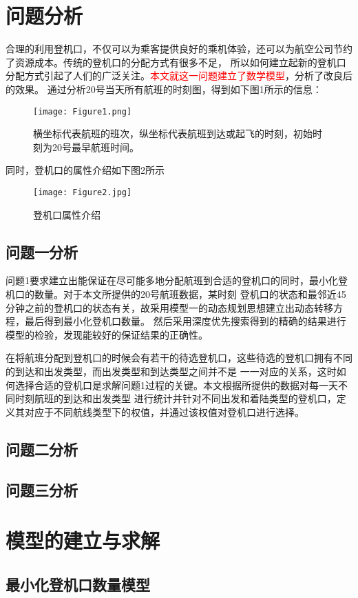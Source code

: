 \documentclass[bwprint]{gmcmthesis}
\begin{document}
\section{问题分析}
合理的利用登机口，不仅可以为乘客提供良好的乘机体验，还可以为航空公司节约了资源成本。传统的登机口的分配方式有很多不足，
所以如何建立起新的登机口分配方式引起了人们的广泛关注。\textcolor{red}{本文就这一问题建立了数学模型}，分析了改良后的效果。
通过分析20号当天所有航班的时刻图，得到如下图1所示的信息：
\begin{figure}[!h]
\centering
\texttt{[image: Figure1.png]}
\caption{
横坐标代表航班的班次，纵坐标代表航班到达或起飞的时刻，初始时刻为20号最早航班时间。}
\end{figure}

同时，登机口的属性介绍如下图2所示
\begin{figure}[!h]
\centering
\texttt{[image: Figure2.jpg]}
\caption{登机口属性介绍}
\end{figure}
\subsection{问题一分析}
问题1要求建立出能保证在尽可能多地分配航班到合适的登机口的同时，最小化登机口的数量。对于本文所提供的20号航班数据，某时刻
登机口的状态和最邻近45分钟之前的登机口的状态有关，故采用模型一的动态规划思想建立出动态转移方程，最后得到最小化登机口数量。
然后采用深度优先搜索得到的精确的结果进行模型的检验，发现能较好的保证结果的正确性。

在将航班分配到登机口的时候会有若干的待选登机口，这些待选的登机口拥有不同的到达和出发类型，而出发类型和到达类型之间并不是
一一对应的关系，这时如何选择合适的登机口是求解问题1过程的关键。本文根据所提供的数据对每一天不同时刻航班的到达和出发类型
进行统计并针对不同出发和着陆类型的登机口，定义其对应于不同航线类型下的权值，并通过该权值对登机口进行选择。
\subsection{问题二分析}

\subsection{问题三分析}

\section{模型的建立与求解}

\subsection{最小化登机口数量模型}
\end{document}
